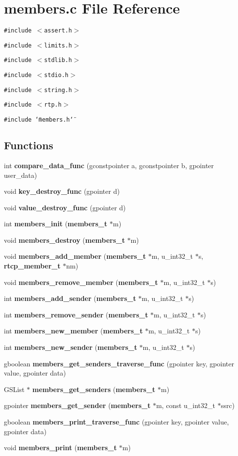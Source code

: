 \section{members.c File Reference}
\label{members_8c}
{\tt \#include $<$assert.h$>$}\par
{\tt \#include $<$limits.h$>$}\par
{\tt \#include $<$stdlib.h$>$}\par
{\tt \#include $<$stdio.h$>$}\par
{\tt \#include $<$string.h$>$}\par
{\tt \#include $<$rtp.h$>$}\par
{\tt \#include \char`\"{}members.h\char`\"{}}\par
\subsection*{Functions}
\begin{CompactItemize}
\item 
int {\bf compare\_\-data\_\-func} (gconstpointer a, gconstpointer b, gpointer user\_\-data)
\item 
void {\bf key\_\-destroy\_\-func} (gpointer d)
\item 
void {\bf value\_\-destroy\_\-func} (gpointer d)
\item 
int {\bf members\_\-init} ({\bf members\_\-t} $\ast$m)
\item 
void {\bf members\_\-destroy} ({\bf members\_\-t} $\ast$m)
\item 
void {\bf members\_\-add\_\-member} ({\bf members\_\-t} $\ast$m, u\_\-int32\_\-t $\ast$s, {\bf rtcp\_\-member\_\-t} $\ast$nm)
\item 
void {\bf members\_\-remove\_\-member} ({\bf members\_\-t} $\ast$m, u\_\-int32\_\-t $\ast$s)
\item 
int {\bf members\_\-add\_\-sender} ({\bf members\_\-t} $\ast$m, u\_\-int32\_\-t $\ast$s)
\item 
int {\bf members\_\-remove\_\-sender} ({\bf members\_\-t} $\ast$m, u\_\-int32\_\-t $\ast$s)
\item 
int {\bf members\_\-new\_\-member} ({\bf members\_\-t} $\ast$m, u\_\-int32\_\-t $\ast$s)
\item 
int {\bf members\_\-new\_\-sender} ({\bf members\_\-t} $\ast$m, u\_\-int32\_\-t $\ast$s)
\item 
gboolean {\bf members\_\-get\_\-senders\_\-traverse\_\-func} (gpointer key, gpointer value, gpointer data)
\item 
GSList $\ast$ {\bf members\_\-get\_\-senders} ({\bf members\_\-t} $\ast$m)
\item 
gpointer {\bf members\_\-get\_\-sender} ({\bf members\_\-t} $\ast$m, const u\_\-int32\_\-t $\ast$ssrc)
\item 
gboolean {\bf members\_\-print\_\-traverse\_\-func} (gpointer key, gpointer value, gpointer data)
\item 
void {\bf members\_\-print} ({\bf members\_\-t} $\ast$m)
\end{CompactItemize}



